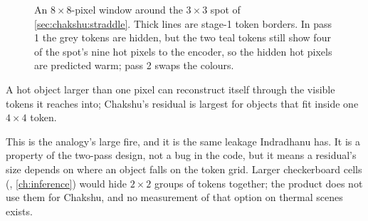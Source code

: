 \begin{figure}[htbp]\centering
{}
\caption{An $8\times8$-pixel window around the $3\times3$ spot of \cref{sec:chakshu:straddle}. Thick lines are stage-1
token borders. In pass 1 the grey tokens are hidden, but the two teal tokens still show four of the spot's nine hot
pixels to the encoder, so the hidden hot pixels are predicted warm; pass 2 swaps the colours.}
\label{fig:chakshu:straddle}
\end{figure}

\begin{keypoint}
A hot object larger than one pixel can reconstruct itself through the visible tokens it reaches into; Chakshu's
residual is largest for objects that fit inside one $4\times4$ token.
\end{keypoint}

This is the analogy's large fire, and it is the same leakage Indradhanu has. It is a property of the two-pass
design, not a bug in the code, but it means a residual's size depends on where an object falls on the token grid.
Larger checkerboard cells (, \cref{ch:inference}) would hide $2\times2$ groups of tokens
together; the product does not use them for Chakshu, and no measurement of that option on thermal scenes exists.

